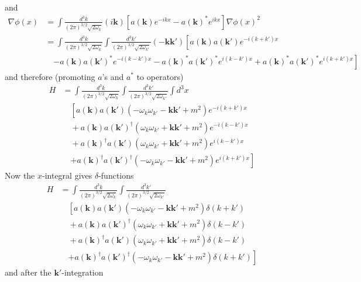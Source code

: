 \documentclass{article}
\begin{document}
and
\begin{align}
\nabla{\phi}(x)
&=\int\frac{d^3k}{(2\pi)^{3/2}\sqrt{2\omega_k}}(i\mathbf{k})\left[a(\mathbf{k})e^{-ikx}-a(\mathbf{k})^*e^{ikx}\right]
\nabla{\phi}(x)^2\\
&=\int\frac{d^3k}{(2\pi)^{3/2}\sqrt{2\omega_k}}\int\frac{d^3k'}{(2\pi)^{3/2}\sqrt{2\omega_{k'}}}(-\mathbf{k}\mathbf{k}')\left[a(\mathbf{k})a(\mathbf{k}')e^{-i(k+k')x}\right.\\
&\quad \left.-a(\mathbf{k})a(\mathbf{k}')^*e^{-i(k-k')x}-a(\mathbf{k})^*a(\mathbf{k}')^*e^{i(k-k')x}+a(\mathbf{k})^*a(\mathbf{k}')^*e^{i(k+k')x}\right]
\end{align}
and therefore (promoting $a$'s and $a^*$ to operators)
\begin{align}
H&=\int\frac{d^3k}{(2\pi)^{3/2}\sqrt{2\omega_k}}\int\frac{d^3k'}{(2\pi)^{3/2}\sqrt{2\omega_{k'}}}\int d^3x\\
&\quad\left[a(\mathbf{k})a(\mathbf{k}')(-\omega_k\omega_{k'}-\mathbf{k}\mathbf{k}'+m^2)e^{-i(k+k')x}\right.\\
&\quad +a(\mathbf{k})a(\mathbf{k}')^\dagger(\omega_k\omega_{k'}+\mathbf{k}\mathbf{k}'+m^2)e^{-i(k-k')x}\\
&\quad +a(\mathbf{k})^\dagger a(\mathbf{k}')(\omega_k\omega_{k'}+\mathbf{k}\mathbf{k}'+m^2)e^{i(k-k')x}\\
&\quad\left.+a(\mathbf{k})^\dagger a(\mathbf{k}')^\dagger(-\omega_k\omega_{k'}-\mathbf{k}\mathbf{k}'+m^2)e^{i(k+k')x}\right]
\end{align}
Now the $x$-integral gives $\delta$-functions
\begin{align}
H&=\int\frac{d^3k}{(2\pi)^{3/2}\sqrt{2\omega_k}}\int\frac{d^3k'}{(2\pi)^{3/2}\sqrt{2\omega_{k'}}}\\
&\quad\left[a(\mathbf{k})a(\mathbf{k}')(-\omega_k\omega_{k'}-\mathbf{k}\mathbf{k}'+m^2)\delta(k+k')\right.\\
&\quad +a(\mathbf{k})a(\mathbf{k}')^\dagger(\omega_k\omega_{k'}+\mathbf{k}\mathbf{k}'+m^2)\delta(k-k')\\
&\quad +a(\mathbf{k})^\dagger a(\mathbf{k}')(\omega_k\omega_{k'}+\mathbf{k}\mathbf{k}'+m^2)\delta(k-k')\\
&\quad\left.+a(\mathbf{k})^\dagger a(\mathbf{k}')^\dagger(-\omega_k\omega_{k'}-\mathbf{k}\mathbf{k}'+m^2)\delta(k+k')\right]
\end{align}
and after the $\mathbf{k}'$-integration
\end{document}
